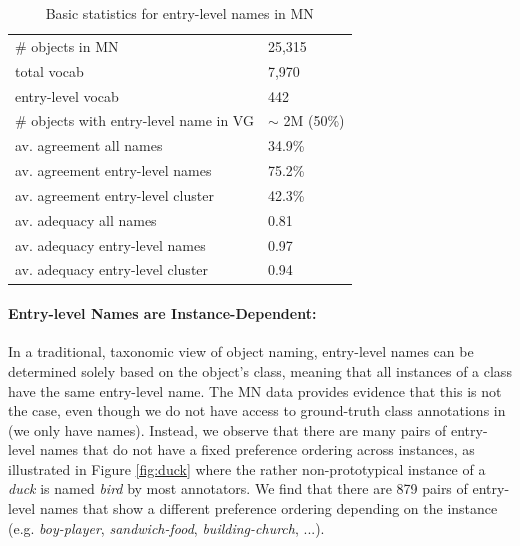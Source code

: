 \begin{table}[t]
	\centering
	\small
	\begin{tabular}{p{5cm}l}
		\toprule		
\# objects in MN & 25,315\\
total vocab  &  7,970\\
entry-level vocab & 442\\
\# objects with entry-level name in VG & $\sim$ 2M (50\%)\\
\midrule
av. agreement all names & 34.9\%\\
av. agreement entry-level names & 75.2\%\\
av. agreement entry-level cluster & 42.3\%\\
\midrule
av. adequacy all names & 0.81\\
av. adequacy entry-level names & 0.97 \\
av. adequacy entry-level cluster & 0.94 \\
\bottomrule	
	\end{tabular}
	\caption{Basic statistics for entry-level names in MN}
	\label{tab:stat-entry-level}
\end{table}

\paragraph{Entry-level Names are Instance-Dependent:} In a traditional, taxonomic view of object naming, entry-level names can be determined solely based on the object's class, meaning that all instances of a class have the same entry-level name. The MN data provides evidence that this is not the case, even though we do not have access to ground-truth class annotations in \vg (we only have names). Instead, we observe that there are many pairs of entry-level names that do not have a fixed preference ordering across instances, as illustrated in Figure \ref{fig:duck} where the rather non-prototypical instance of a \textit{duck} is named \textit{bird} by most annotators. We find that there are 879 pairs of entry-level names that show a different preference ordering depending on the instance (e.g. \textit{boy-player}, \textit{sandwich-food}, \textit{building-church}, ...).
  


